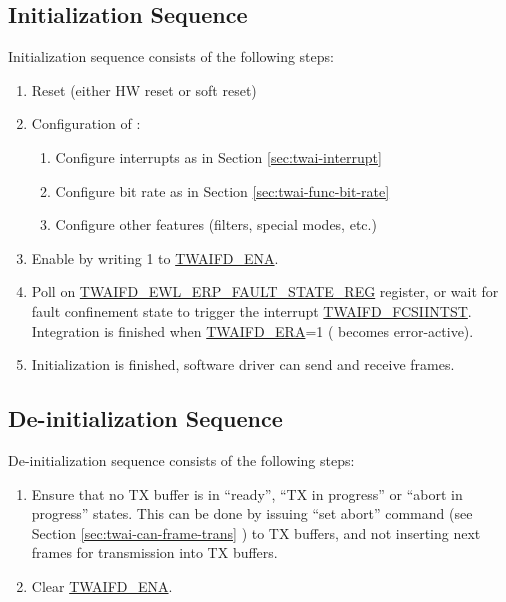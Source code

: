 \documentclass[main\_\_EN.tex]{subfiles}
\begin{document}
\subsection{Initialization Sequence}

Initialization sequence consists of the following steps:

\begin{enumerate}
    \item Reset (either HW reset or soft reset)
    \item Configuration of \modulename{}:
    \begin{enumerate}
        \item Configure interrupts as in Section \ref{sec:twai-interrupt} \textit{}
        \item Configure bit rate as in Section \ref{sec:twai-func-bit-rate} \textit{}
        \item Configure other features (filters, special modes, etc.)
    \end{enumerate}
    \item Enable \modulename{} by writing 1 to \hyperref[fielddesc:TWAIFDENA]{TWAIFD\_ENA}.
    \item Poll on \hyperref[regdesc:TWAIFDEWLERPFAULTSTATEREG]{TWAIFD\_EWL\_ERP\_FAULT\_STATE\_REG} register, or wait for fault confinement state to trigger the interrupt \hyperref[fielddesc:TWAIFDFCSIINTST]{TWAIFD\_FCSIINTST}. Integration is finished when \hyperref[fielddesc:TWAIFDERA]{TWAIFD\_ERA}=1 (\modulename{} becomes error-active).
    \item Initialization is finished, software driver can send and receive frames.
\end{enumerate}


\subsection{De-initialization Sequence}

De-initialization sequence consists of the following steps:

\begin{enumerate}
    \item Ensure that no TX buffer is in ``ready'', ``TX in progress'' or ``abort in progress'' states. This can be done by issuing ``set abort'' command (see Section \ref{sec:twai-can-frame-trans} \textit{}) to TX buffers, and not inserting next frames for transmission into TX buffers.
    \item Clear \hyperref[fielddesc:TWAIFDENA]{TWAIFD\_ENA}.
\end{enumerate}
\end{document}
